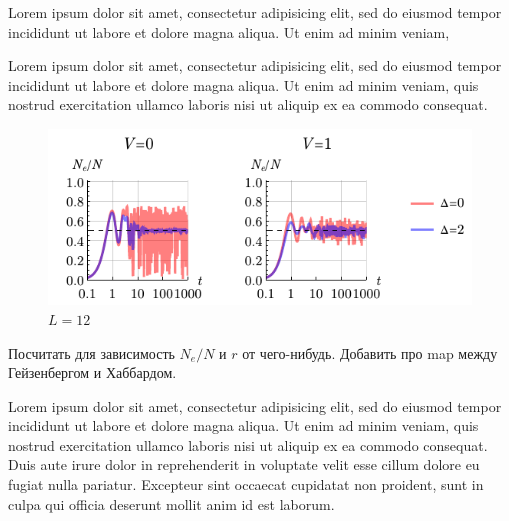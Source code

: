 


\newpage




Lorem ipsum dolor sit amet, consectetur adipisicing elit, sed do eiusmod
tempor incididunt ut labore et dolore magna aliqua. Ut enim ad minim veniam,



Lorem ipsum dolor sit amet, consectetur adipisicing elit, sed do eiusmod
tempor incididunt ut labore et dolore magna aliqua. Ut enim ad minim veniam,
quis nostrud exercitation ullamco laboris nisi ut aliquip ex ea commodo
consequat. 

\begin{figure}[h]
    \centering
    \includegraphics{imgs/loVD.pdf}
    \caption{$L=12$}
\end{figure}



Посчитать для зависимость $N_e/ N$ и $r$ от чего-нибудь. Добавить про map между Гейзенбергом и Хаббардом. 

\newpage

Lorem ipsum dolor sit amet, consectetur adipisicing elit, sed do eiusmod
tempor incididunt ut labore et dolore magna aliqua. Ut enim ad minim veniam,
quis nostrud exercitation ullamco laboris nisi ut aliquip ex ea commodo
consequat. Duis aute irure dolor in reprehenderit in voluptate velit esse
cillum dolore eu fugiat nulla pariatur. Excepteur sint occaecat cupidatat non
proident, sunt in culpa qui officia deserunt mollit anim id est laborum.


